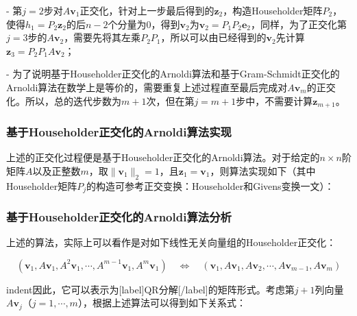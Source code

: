 \documentclass[UTF8,nofonts]{ctexart}
\begin{document}
- 第$j=2$步对$A\boldsymbol{v}_1$正交化，针对上一步最后得到的$\boldsymbol{z}_2$，构造Householder矩阵$P_2$，使得$h_1=P_2\boldsymbol{z}_2$的后$n-2$个分量为$0$，得到$\boldsymbol{v}_2$为$\boldsymbol{v}_2=P_1P_2\boldsymbol{e}_2$，同样，为了正交化第$j=3$步的$A\boldsymbol{v}_2$，需要先将其左乘$P_2P_1$，所以可以由已经得到的$\boldsymbol{v}_2$先计算$\boldsymbol{z}_3=P_2P_1A\boldsymbol{v}_2$；

- 为了说明基于Householder正交化的Arnoldi算法和基于Gram-Schmidt正交化的Arnoldi算法在数学上是等价的，需要重复上述过程直至最后完成对$A\boldsymbol{v}_m$的正交化。所以，总的迭代步数为$m+1$次，但在第$j=m+1$步中，不需要计算$\boldsymbol{z}_{m+1}$。

\subsubsection*{基于Householder正交化的Arnoldi算法实现}

上述的正交化过程便是基于Householder正交化的Arnoldi算法。对于给定的$n \times n$阶矩阵$A$以及正整数$m$，取$\|\boldsymbol{v}_1\|_2=1$，且$\boldsymbol{z}_1=\boldsymbol{v}_1$，则算法实现如下（其中Householder矩阵$P_j$的构造可参考正交变换：Householder和Givens变换一文）：

\begin{algorithm}[H]
\end{algorithm}

\subsubsection*{基于Householder正交化的Arnoldi算法分析}

上述的算法，实际上可以看作是对如下线性无关向量组的Householder正交化：

\[
\left(\boldsymbol{v}_1,A\boldsymbol{v}_1,A^2\boldsymbol{v}_1,\cdots,A^{m-1}\boldsymbol{v}_1,A^m\boldsymbol{v}_1\right) \quad\Longleftrightarrow\quad
\left(\boldsymbol{v}_1,A\boldsymbol{v}_1,A\boldsymbol{v}_2,\cdots,A\boldsymbol{v}_{m-1},A\boldsymbol{v}_m\right)
\]

indent因此，它可以表示为[label]QR分解[/label]的矩阵形式。考虑第$j+1$列向量$A\boldsymbol{v}_j$（$j=1,\cdots,m$），根据上述算法可以得到如下关系式：
\end{document}
